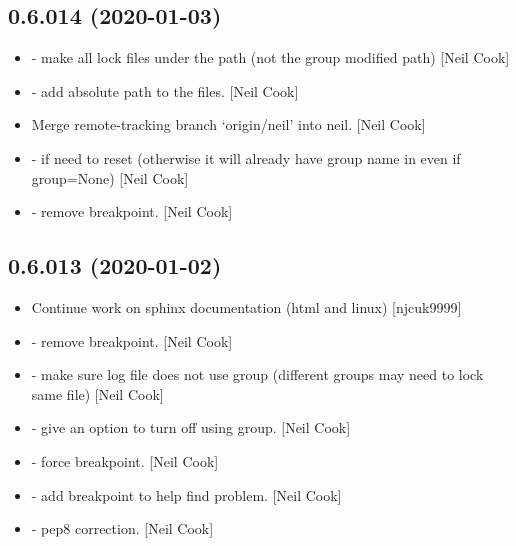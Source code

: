 \documentclass[a4paper,10pt,english]{report}
\begin{document}
\subsection{0.6.014 (2020-01-03)}
\label{\detokenize{misc/changelog:id5}}\begin{itemize}
\item {} 
 - make all lock files under the  path (not
the group modified path) {[}Neil Cook{]}

\item {} 
 - add absolute path to the files. {[}Neil Cook{]}

\item {} 
Merge remote-tracking branch ‘origin/neil’ into neil. {[}Neil Cook{]}

\item {} 
 - if  need to reset 
(otherwise it will already have group name in even if group=None)
{[}Neil Cook{]}

\item {} 
 - remove breakpoint. {[}Neil Cook{]}

\end{itemize}


\subsection{0.6.013 (2020-01-02)}
\label{\detokenize{misc/changelog:id6}}\begin{itemize}
\item {} 
Continue work on sphinx documentation (html and linux) {[}njcuk9999{]}

\item {} 
 - remove breakpoint. {[}Neil Cook{]}

\item {} 
 - make sure log file does not use group
(different groups may need to lock same file) {[}Neil Cook{]}

\item {} 
 - give an option to turn off using group. {[}Neil
Cook{]}

\item {} 
 - force breakpoint. {[}Neil Cook{]}

\item {} 
 - add breakpoint to help find
problem. {[}Neil Cook{]}

\item {} 
 - pep8 correction. {[}Neil Cook{]}

\end{itemize}
\end{document}
